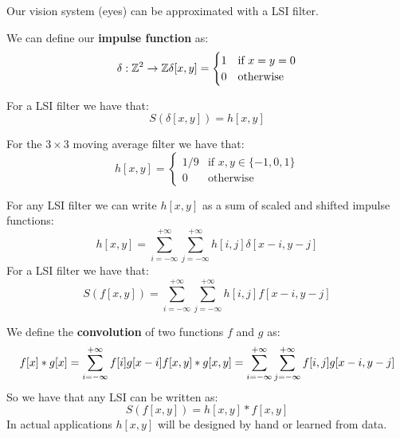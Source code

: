 Our vision system (eyes) can be approximated with a LSI filter.

We can define our \textbf{impulse function} as: 
\[
    \delta: \mathbb{Z}^2 \rightarrow \mathbb{Z} \\
    \delta[x,y]=\begin{cases}
        1 & \text{if } x=y=0 \\
        0 & \text{otherwise}
    \end{cases}
\]

For a LSI filter we have that:
\[
    S(\delta[x,y])=h[x,y]
\]

For the $3\times 3$ moving average filter we have that:
\[
    h[x,y]=\begin{cases}
        1/9 & \text{if } x,y\in\{-1,0,1\} \\
        0 & \text{otherwise}
    \end{cases}
\]

For any LSI filter we can write $h[x,y]$ as a sum of scaled and shifted impulse functions:
\[
    h[x,y]=\sum_{i=-\infty}^{+\infty}\sum_{j=-\infty}^{+\infty}h[i,j]\delta[x-i,y-j]
\]
For a LSI filter we have that:
\[
    S(f[x,y])=\sum_{i=-\infty}^{+\infty}\sum_{j=-\infty}^{+\infty}h[i,j]f[x-i,y-j]
\]

We define the \textbf{convolution} of two functions $f$ and $g$ as:
\[
    f[x]*g[x]=\sum_{i=-\infty}^{+\infty}f[i]g[x-i] \\
    f[x,y]*g[x,y]=\sum_{i=-\infty}^{+\infty}\sum_{j=-\infty}^{+\infty}f[i,j]g[x-i,y-j]
\]
So we have that any LSI can be written as:
\[
    S(f[x,y])=h[x,y]*f[x,y]
\]
In actual applications $h[x,y]$ will be designed by hand
or learned from data.
